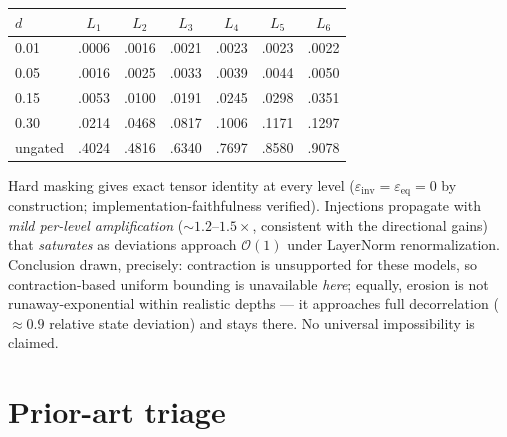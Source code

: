 \documentclass[11pt]{article}
\theoremstyle{definition}\newtheorem{definition}{Definition}
\theoremstyle{remark}\newtheorem{remark}{Remark}
\begin{document}
\begin{center}\small
\begin{tabular}{lcccccc}
\toprule
$d$ & $L_1$ & $L_2$ & $L_3$ & $L_4$ & $L_5$ & $L_6$ \\
\midrule
0.01 & .0006 & .0016 & .0021 & .0023 & .0023 & .0022 \\
0.05 & .0016 & .0025 & .0033 & .0039 & .0044 & .0050 \\
0.15 & .0053 & .0100 & .0191 & .0245 & .0298 & .0351 \\
0.30 & .0214 & .0468 & .0817 & .1006 & .1171 & .1297 \\
ungated & .4024 & .4816 & .6340 & .7697 & .8580 & .9078 \\
\bottomrule
\end{tabular}
\end{center}

Hard masking gives exact tensor identity at every level ($\varepsilon_{\mathrm{inv}}
=\varepsilon_{\mathrm{eq}}=0$ by construction; implementation-faithfulness verified).
Injections propagate with \emph{mild per-level amplification} (${\sim}1.2$--$1.5\times$,
consistent with the directional gains) that \emph{saturates} as deviations approach
$\mathcal{O}(1)$ under LayerNorm renormalization. Conclusion drawn, precisely: contraction
is unsupported for these models, so contraction-based uniform bounding is unavailable
\emph{here}; equally, erosion is not runaway-exponential within realistic depths --- it
approaches full decorrelation (${\approx}0.9$ relative state deviation) and stays there.
No universal impossibility is claimed.

\section{Prior-art triage}\label{app:prior}
\end{document}
